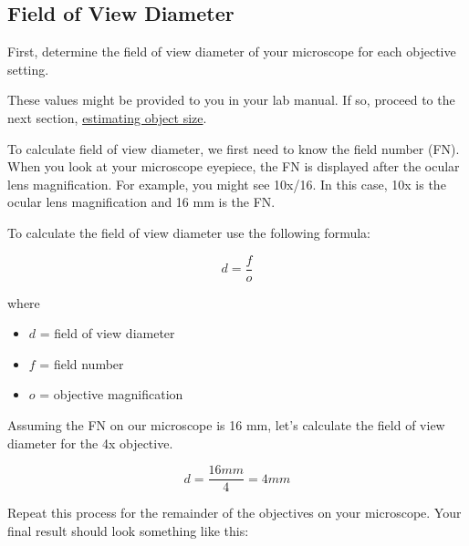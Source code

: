 \documentclass[
]{book}
\providecommand{\tightlist}{%
  \setlength{\itemsep}{0pt}\setlength{\parskip}{0pt}}
\begin{document}
\subsection*{Field of View Diameter}\label{field-of-view-diameter}

First, determine the field of view diameter of your microscope for each objective setting.

These values might be provided to you in your lab manual. If so, proceed to the next section, \hyperref[estimating-object-size]{estimating object size}.

To calculate field of view diameter, we first need to know the field number (FN). When you look at your microscope eyepiece, the FN is displayed after the ocular lens magnification. For example, you might see 10x/16. In this case, 10x is the ocular lens magnification and 16 mm is the FN.

To calculate the field of view diameter use the following formula:

\[d = \frac{f}{o}\]

where

\begin{itemize}
\tightlist
\item
  \(d\) = field of view diameter
\item
  \(f\) = field number
\item
  \(o\) = objective magnification
\end{itemize}

Assuming the FN on our microscope is 16 mm, let's calculate the field of view diameter for the 4x objective.

\[d = \frac{16 mm}{4} = 4 mm\]

Repeat this process for the remainder of the objectives on your microscope. Your final result should look something like this:
\end{document}
